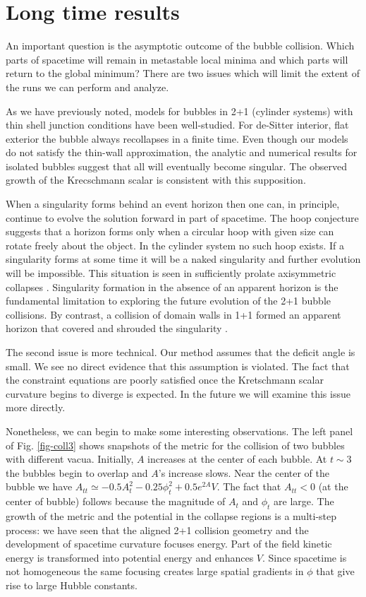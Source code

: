 \documentclass[preprintnumbers,eqsecnum,aps,prd,epsf,showpacs,nofootinbib
]{revtex4}
\begin{document}
\newpage

\section{Long time results}

An important question is the asymptotic outcome of the bubble
collision. Which parts of spacetime will remain in metastable local
minima and which parts will return to the global minimum?  There are
two issues which will limit the extent of the runs we can perform and
analyze.

As we have previously noted, models for bubbles in 2+1 (cylinder
systems) with thin shell junction conditions have been
well-studied. For de-Sitter interior, flat exterior the bubble always
recollapses in a finite time.  Even though our models do not satisfy
the thin-wall approximation, the analytic and numerical results for
isolated bubbles suggest that all will eventually become singular.
The observed growth of the Krecschmann scalar is consistent with this
supposition.

When a singularity forms behind an event horizon then one can, in
principle, continue to evolve the solution forward in part of
spacetime.  The hoop conjecture \cite{Thorne:1972ji} suggests that a
horizon forms only when a circular hoop with given size can rotate
freely about the object. In the cylinder system no such hoop
exists. If a singularity forms at some time it will be a naked
singularity and further evolution will be impossible. This situation
is seen in sufficiently prolate axisymmetric collapses
\cite{Shapiro:1991zza}. Singularity formation in the absence of an
apparent horizon is the fundamental limitation to exploring the future
evolution of the 2+1 bubble collisions. By contrast, a collision of
domain walls in 1+1 formed an apparent horizon that covered and
shrouded the singularity \cite{Takamizu:2007ks,Takamizu:2006yd}.

The second issue is more technical. Our method assumes that the deficit angle
is small.  We see no direct evidence that this assumption is violated.
The fact that the constraint equations are poorly satisfied once the
Kretschmann scalar curvature begins to diverge is expected. In the
future we will examine this issue more directly.

Nonetheless, we can begin to make some interesting observations. The
left panel of Fig. \ref{fig-coll3} shows snapshots of the metric for
the collision of two bubbles with different vacua. Initially, $A$
increases at the center of each bubble. At $t \sim 3$ the bubbles
begin to overlap and $A$'s increase slows. Near the center of the
bubble we have $A_{tt}\simeq -0.5A_t^2-0.25\phi_t^2+0.5 e^{2A}V$. The
fact that $A_{tt}<0$ (at the center of bubble) follows because the
magnitude of $A_t$ and $\phi_t$ are large.  The growth of the metric
and the potential in the collapse regions is a multi-step process: we
have seen that the aligned 2+1 collision geometry and the development
of spacetime curvature focuses energy. Part of the field kinetic
energy is transformed into potential energy and enhances $V$. Since
spacetime is not homogeneous the same focusing creates large spatial
gradients in $\phi$ that give rise to large Hubble constants.
\end{document}

